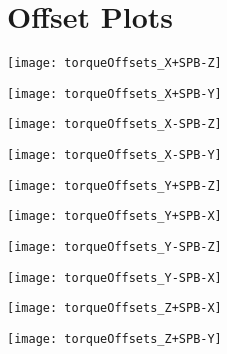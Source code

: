 
\chapter{Offset Plots}

\label{ch:offplot}

\texttt{[image: torqueOffsets\_X+SPB-Z]}

\texttt{[image: torqueOffsets\_X+SPB-Y]}


\texttt{[image: torqueOffsets\_X-SPB-Z]}

\texttt{[image: torqueOffsets\_X-SPB-Y]}


\texttt{[image: torqueOffsets\_Y+SPB-Z]}

\texttt{[image: torqueOffsets\_Y+SPB-X]}


\texttt{[image: torqueOffsets\_Y-SPB-Z]}

\texttt{[image: torqueOffsets\_Y-SPB-X]}


\texttt{[image: torqueOffsets\_Z+SPB-X]}

\texttt{[image: torqueOffsets\_Z+SPB-Y]}

